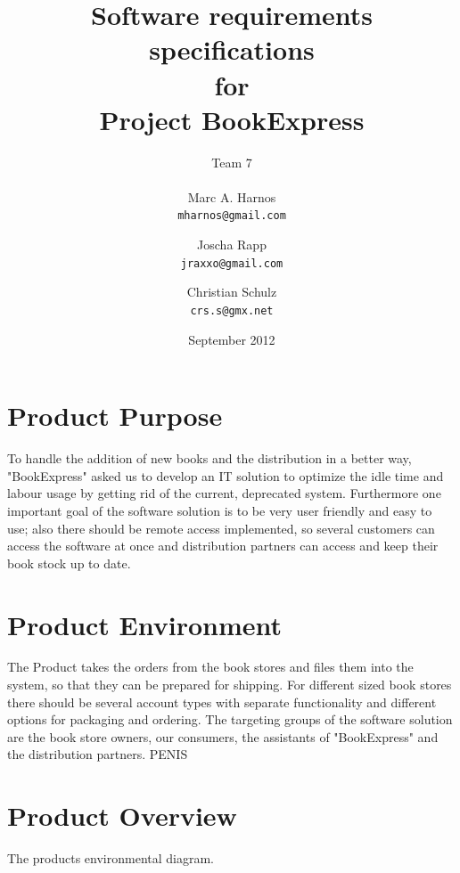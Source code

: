 \documentclass[11pt,a4paper,oneside,svgnames]{report}
\begin{document}
\title{Software requirements specifications\\ for\\ Project BookExpress}
\author{Team 7\\ \\ Marc A. Harnos\\ \texttt{mharnos@gmail.com} \and Joscha Rapp\\ \texttt{jraxxo@gmail.com} \and Christian Schulz\\ \texttt{crs.s@gmx.net}}
\date{September 2012}
\maketitle
\tableofcontents

\chapter{Product Purpose}
To handle the addition of new books and the distribution in a better way, "BookExpress" asked us to develop an IT solution to optimize the idle time and labour usage by getting rid of the current, deprecated system. Furthermore one important goal of the software solution is to be very user friendly and easy to use; also there should be remote access implemented, so several customers can access the software at once and distribution partners can access and keep their book stock up to date.

\chapter{Product Environment}
The Product takes the orders from the book stores and files them into the system, so that they can be prepared for shipping. For different sized book stores there should be several account types with separate functionality and different options for packaging and ordering. The targeting groups of the software solution are the book store owners, our consumers, the assistants of "BookExpress" and the distribution partners. PENIS

\chapter{Product Overview}
The products environmental diagram.
\end{document}
